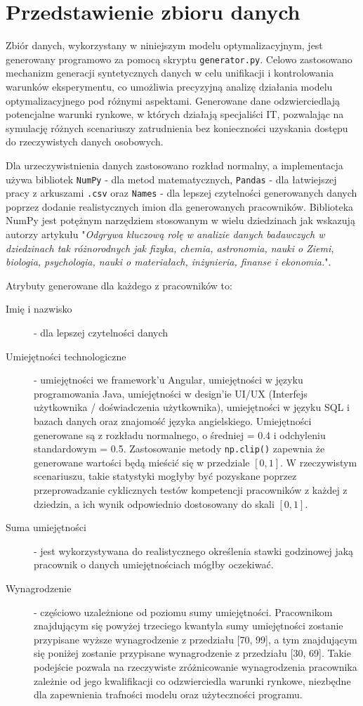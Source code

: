 \section{Przedstawienie zbioru danych}
\par Zbiór danych, wykorzystany w niniejszym modelu optymalizacyjnym, jest generowany programowo za pomocą skryptu \verb|generator.py|. Celowo zastosowano mechanizm generacji syntetycznych danych w celu unifikacji i kontrolowania warunków eksperymentu, co umożliwia precyzyjną analizę działania modelu optymalizacyjnego pod różnymi aspektami. Generowane dane odzwierciedlają potencjalne warunki rynkowe, w których działają specjaliści IT, pozwalając na symulację różnych scenariuszy zatrudnienia bez konieczności uzyskania dostępu do rzeczywistych danych osobowych. 
\par Dla urzeczywistnienia danych zastosowano rozkład normalny, a implementacja używa bibliotek \verb|NumPy| - dla metod matematycznych, \verb|Pandas| - dla łatwiejszej pracy z arkuszami \verb|.csv| oraz \verb|Names| - dla lepszej czytelności generowanych danych poprzez dodanie realistycznych imion dla generowanych pracowników. Biblioteka NumPy jest potężnym narzędziem stosowanym w wielu dziedzinach jak wskazują autorzy artykułu \parencite{harris2020array} "\textit{Odgrywa kluczową rolę w analizie danych badawczych w dziedzinach tak różnorodnych jak fizyka, chemia, astronomia, nauki o Ziemi, biologia, psychologia, nauki o materiałach, inżynieria, finanse i ekonomia.}".
\par Atrybuty generowane dla każdego z pracowników to:
\begin{description}
    \item[Imię i nazwisko] - dla lepszej czytelności danych
    \item[Umiejętności technologiczne] - umiejętności we framework’u Angular, umiejętności w języku programowania Java, umiejętności w design’ie UI/UX (Interfejs użytkownika / doświadczenia użytkownika), umiejętności w języku SQL i bazach danych oraz znajomość języka angielskiego. Umiejętności generowane są z rozkładu normalnego, o średniej = 0.4 i odchyleniu standardowym = 0.5. Zastosowanie metody \verb|np.clip()| zapewnia że generowane wartości będą mieścić się w przedziale $[0, 1]$. W rzeczywistym scenariuszu, takie statystyki mogłyby być pozyskane poprzez przeprowadzanie cyklicznych testów kompetencji pracowników z każdej z dziedzin, a ich wynik odpowiednio dostosowany do skali $[0, 1]$.
    \item[Suma umiejętności\label{itm:suma_umiejetnosci}] - jest wykorzystywana do realistycznego określenia stawki godzinowej jaką pracownik o danych umiejętnościach mógłby oczekiwać. 
    \item[Wynagrodzenie] - częściowo uzależnione od poziomu sumy umiejętności. Pracownikom znajdującym się powyżej trzeciego kwantyla sumy umiejętności zostanie przypisane wyższe wynagrodzenie z przedziału [70, 99], a tym znajdującym się poniżej zostanie przypisane wynagrodzenie z przedziału [30, 69]. Takie podejście pozwala na rzeczywiste zróżnicowanie wynagrodzenia pracownika zależnie od jego kwalifikacji co odzwierciedla warunki rynkowe, niezbędne dla zapewnienia trafności modelu oraz użyteczności programu.
\end{description}
